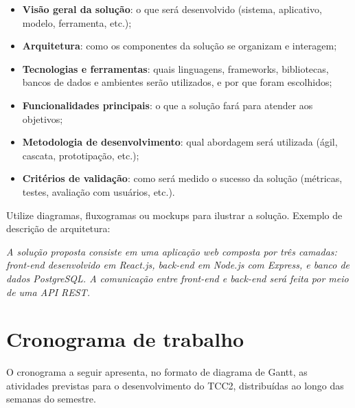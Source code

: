 \documentclass[
    12pt,                %
    openright,           %
    oneside,             %
    a4paper,             %
    english,             %
    brazil               %
]{abntex2}
\begin{document}
\begin{itemize}
    \item \textbf{Visão geral da solução}: o que será desenvolvido (sistema, aplicativo, modelo, ferramenta, etc.);
    \item \textbf{Arquitetura}: como os componentes da solução se organizam e interagem;
    \item \textbf{Tecnologias e ferramentas}: quais linguagens, frameworks, bibliotecas, bancos de dados e ambientes serão utilizados, e por que foram escolhidos;
    \item \textbf{Funcionalidades principais}: o que a solução fará para atender aos objetivos;
    \item \textbf{Metodologia de desenvolvimento}: qual abordagem será utilizada (ágil, cascata, prototipação, etc.);
    \item \textbf{Critérios de validação}: como será medido o sucesso da solução (métricas, testes, avaliação com usuários, etc.).
\end{itemize}

Utilize diagramas, fluxogramas ou mockups para ilustrar a solução. Exemplo de descrição de arquitetura:

\textit{A solução proposta consiste em uma aplicação web composta por três camadas: front-end desenvolvido em React.js, back-end em Node.js com Express, e banco de dados PostgreSQL. A comunicação entre front-end e back-end será feita por meio de uma API REST.}

\section{Cronograma de trabalho}
\label{sec:cronograma}

O cronograma a seguir apresenta, no formato de diagrama de Gantt, as atividades previstas para o desenvolvimento do TCC2, distribuídas ao longo das semanas do semestre.
\end{document}
